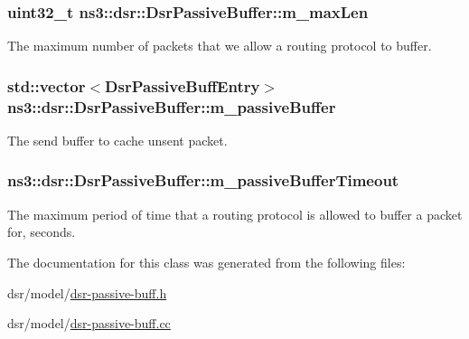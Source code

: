 \subsubsection[{\texorpdfstring{m\+\_\+max\+Len}{m_maxLen}}]{\setlength{\rightskip}{0pt plus 5cm}uint32\+\_\+t ns3\+::dsr\+::\+Dsr\+Passive\+Buffer\+::m\+\_\+max\+Len\hspace{0.3cm}{\ttfamily [private]}}\hypertarget{classns3_1_1dsr_1_1DsrPassiveBuffer_a71c5e37beeec5c22e8d791f738d542fb}{}\label{classns3_1_1dsr_1_1DsrPassiveBuffer_a71c5e37beeec5c22e8d791f738d542fb}


The maximum number of packets that we allow a routing protocol to buffer. 

\subsubsection[{\texorpdfstring{m\+\_\+passive\+Buffer}{m_passiveBuffer}}]{\setlength{\rightskip}{0pt plus 5cm}std\+::vector$<${\bf Dsr\+Passive\+Buff\+Entry}$>$ ns3\+::dsr\+::\+Dsr\+Passive\+Buffer\+::m\+\_\+passive\+Buffer\hspace{0.3cm}{\ttfamily [private]}}\hypertarget{classns3_1_1dsr_1_1DsrPassiveBuffer_ab31ade1fb99b99f777a393ca21162535}{}\label{classns3_1_1dsr_1_1DsrPassiveBuffer_ab31ade1fb99b99f777a393ca21162535}


The send buffer to cache unsent packet. 

\subsubsection[{\texorpdfstring{m\+\_\+passive\+Buffer\+Timeout}{m_passiveBufferTimeout}}]{ ns3\+::dsr\+::\+Dsr\+Passive\+Buffer\+::m\+\_\+passive\+Buffer\+Timeout\hspace{0.3cm}{\ttfamily [private]}}\hypertarget{classns3_1_1dsr_1_1DsrPassiveBuffer_a80d23b7cccce40b45429d3627f228db0}{}\label{classns3_1_1dsr_1_1DsrPassiveBuffer_a80d23b7cccce40b45429d3627f228db0}


The maximum period of time that a routing protocol is allowed to buffer a packet for, seconds. 



The documentation for this class was generated from the following files\+:\begin{DoxyCompactItemize}
\item 
dsr/model/\hyperlink{dsr-passive-buff_8h}{dsr-\/passive-\/buff.\+h}\item 
dsr/model/\hyperlink{dsr-passive-buff_8cc}{dsr-\/passive-\/buff.\+cc}\end{DoxyCompactItemize}
